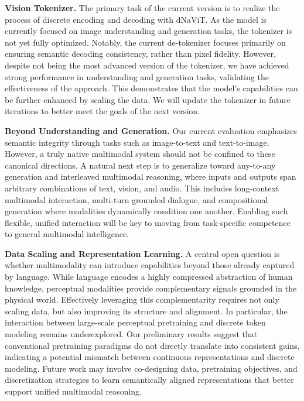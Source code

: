 \documentclass{article}
\begin{document}
\textbf{Vision Tokenizer.} The primary task of the current version is to realize the process of discrete encoding and decoding with dNaViT. As the model is currently focused on image understanding and generation tasks, the tokenizer is not yet fully optimized. Notably, the current de-tokenizer focuses primarily on ensuring semantic decoding consistency, rather than pixel fidelity. However, despite not being the most advanced version of the tokenizer, we have achieved strong performance in understanding and generation tasks, validating the effectiveness of the approach. This demonstrates that the model's capabilities can be further enhanced by scaling the data. We will update the tokenizer in future iterations to better meet the goals of the next version.


\textbf{Beyond Understanding and Generation.}
Our current evaluation emphasizes semantic integrity through tasks such as image-to-text and text-to-image. However, a truly native multimodal system should not be confined to these canonical directions. A natural next step is to generalize toward any-to-any generation and interleaved multimodal reasoning, where inputs and outputs span arbitrary combinations of text, vision, and audio. This includes long-context multimodal interaction, multi-turn grounded dialogue, and compositional generation where modalities dynamically condition one another. Enabling such flexible, unified interaction will be key to moving from task-specific competence to general multimodal intelligence.

\textbf{Data Scaling and Representation Learning.} A central open question is whether multimodality can introduce capabilities beyond those already captured by language. While language encodes a highly compressed abstraction of human knowledge, perceptual modalities provide complementary signals grounded in the physical world. Effectively leveraging this complementarity requires not only scaling data, but also improving its structure and alignment. In particular, the interaction between large-scale perceptual pretraining and discrete token modeling remains underexplored. Our preliminary results suggest that conventional pretraining paradigms do not directly translate into consistent gains, indicating a potential mismatch between continuous representations and discrete modeling. Future work may involve co-designing data, pretraining objectives, and discretization strategies to learn semantically aligned representations that better support unified multimodal reasoning.
\end{document}
